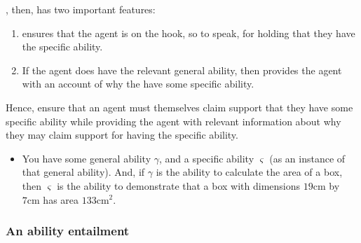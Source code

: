 \begin{note}
  \gsi{}, then, has two important features:
  \begin{enumerate}
  \item \gsi{} ensures that the agent is on the hook, so to speak, for holding that they have the specific ability.
  \item If the agent does have the relevant general ability, then \gsi{} provides the agent with an account of why the have some specific ability.
  \end{enumerate}
  Hence, \gsi{} ensure that an agent must themselves claim support that they have some specific ability while providing the agent with relevant information about why they may claim support for having the specific ability.
\end{note}

\begin{note}
  \color{red}
  \begin{itemize}
  \item You have some general ability \(\gamma\), and a specific ability \(\varsigma\) (as an instance of that general ability).
    And, if \(\gamma\) is the ability to calculate the area of a box, then \(\varsigma\) is the ability to demonstrate that a box with dimensions \(19\text{cm}\) by \(7\text{cm}\) has area \(133\text{cm}^{2}\).
  \end{itemize}
\end{note}

\subsubsection{An ability entailment}
\label{sec:ability-entailment}

